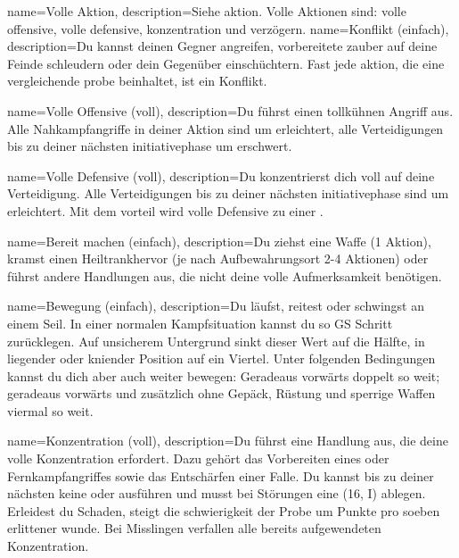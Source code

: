 {
    name={Volle Aktion},
    description={Siehe \gls{aktion}. Volle Aktionen sind: \gls{volle offensive}, \gls{volle defensive}, \gls{konzentration} und \gls{verzögern}.}}
{
    name={Konflikt (einfach)},
    description={Du kannst deinen Gegner angreifen, vorbereitete \gls{zauber} auf deine Feinde schleudern oder dein Gegenüber \gls{einschüchtern}. Fast jede \gls{aktion}, die eine \gls{vergleichende probe beinhaltet}, ist ein Konflikt.}}

{
    name={Volle Offensive (voll)},
    description={Du führst einen tollkühnen Angriff aus. Alle Nahkampfangriffe in deiner Aktion sind um  erleichtert, alle Verteidigungen bis zu deiner nächsten \gls{initiativephase} um  erschwert.}}

{
    name={Volle Defensive (voll)},
    description={Du konzentrierst dich voll auf deine Verteidigung. Alle Verteidigungen bis zu deiner nächsten \gls{initiativephase} sind um  erleichtert. Mit dem \gls{vorteil}  wird volle Defensive zu einer .}}

{
    name={Bereit machen (einfach)},
     description={Du ziehst eine Waffe (1 Aktion), kramst einen Heiltrankhervor (je nach Aufbewahrungsort 2-4 Aktionen) oder führst andere Handlungen aus, die nicht deine volle Aufmerksamkeit benötigen.}}

{
    name={Bewegung (einfach)},
    description={Du läufst, reitest oder schwingst an einem Seil. In einer normalen Kampfsituation kannst du so GS Schritt zurücklegen. Auf unsicherem Untergrund sinkt dieser Wert auf die Hälfte, in liegender oder kniender Position auf ein Viertel. Unter folgenden Bedingungen kannst du dich aber auch weiter bewegen: Geradeaus vorwärts doppelt so weit; geradeaus vorwärts und zusätzlich ohne Gepäck, Rüstung und sperrige Waffen viermal so weit.}}

{
    name={Konzentration (voll)},
    description={Du führst eine Handlung aus, die deine volle Konzentration erfordert. Dazu gehört das Vorbereiten eines  oder Fernkampfangriffes sowie das Entschärfen einer Falle. Du kannst bis zu deiner nächsten  keine  oder  ausführen und musst bei Störungen eine  (16, \gls{I}) ablegen. Erleidest du Schaden, steigt die \gls{schwierigkeit} der Probe um  Punkte pro soeben erlittener \gls{wunde}. Bei Misslingen verfallen alle bereits aufgewendeten  Konzentration.}}


